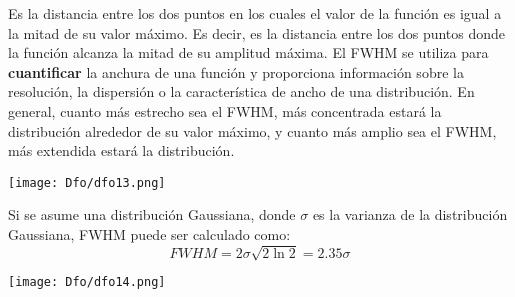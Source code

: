 \documentclass[12pt,fleqn,a4paper,oneside]{LegrandOrangeBook}
\begin{document}
\begin{definition}
Es la distancia entre los dos puntos en los cuales el valor de la función es igual a la mitad de su valor máximo. Es decir, es la distancia entre los dos puntos donde la función alcanza la mitad de su amplitud máxima. El FWHM se utiliza para \textbf{cuantificar} la anchura de una función y proporciona información sobre la resolución, la dispersión o la característica de ancho de una distribución. En general, cuanto más estrecho sea el FWHM, más concentrada estará la distribución alrededor de su valor máximo, y cuanto más amplio sea el FWHM, más extendida estará la distribución.
\begin{center}
\texttt{[image: Dfo/dfo13.png]}
\end{center}
Si se asume una distribución Gaussiana, donde $\sigma$ es la varianza de la distribución Gaussiana, FWHM puede ser calculado como:
\begin{equation}
FWHM=2\sigma\sqrt{2\ln 2}=2.35\sigma
\end{equation}
\begin{center}
\texttt{[image: Dfo/dfo14.png]}
\end{center}
\end{definition}
\end{document}
